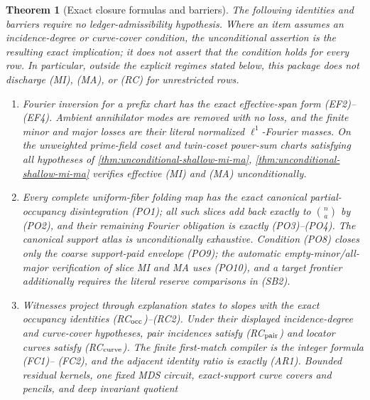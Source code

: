 \documentclass[12pt,a4paper]{amsart}
\numberwithin{equation}{section}
\newtheorem{theorem}{Theorem}[section]
\theoremstyle{remark}
\begin{document}
\begin{theorem}[Exact closure formulas and barriers]
\label{thm:intro-closure-barrier-package}
The following identities and barriers require no ledger-admissibility
hypothesis.  Where an item assumes an incidence-degree or curve-cover
condition, the unconditional assertion is the resulting exact implication;
it does not assert that the condition holds for every row.  In particular,
outside the explicit regimes stated below, this package does not discharge
\textup{(MI)}, \textup{(MA)}, or \textup{(RC)} for unrestricted rows.
\begin{enumerate}[label=\textup{(\roman*)},leftmargin=*]
\item Fourier inversion for a prefix chart has the exact effective-span
      form \textup{(EF2)}--\textup{(EF4)}.  Ambient annihilator modes are
      removed with no loss, and the finite minor and major losses are their
      literal normalized \(\ell^1\)-Fourier masses.  On the unweighted
      prime-field coset and twin-coset power-sum charts satisfying all
      hypotheses of \cref{thm:unconditional-shallow-mi-ma},
      \cref{thm:unconditional-shallow-mi-ma} verifies effective
      \textup{(MI)} and \textup{(MA)} unconditionally.
\item Every complete uniform-fiber folding map has the exact canonical
      partial-occupancy disintegration \textup{(PO1)}; all such slices add
      back exactly to \(\binom na\) by \textup{(PO2)}, and their remaining
      Fourier obligation is exactly \textup{(PO3)}--\textup{(PO4)}.  The
      canonical support atlas is unconditionally exhaustive.  Condition
      \textup{(PO8)} closes only the coarse support-paid envelope
      \textup{(PO9)}; the automatic empty-minor/all-major verification of
      slice MI and MA uses \textup{(PO10)}, and a target frontier
      additionally requires the literal reserve comparisons in
      \textup{(SB2)}.
\item Witnesses project through explanation states to slopes with the
      exact occupancy identities \textup{(RC$_{\rm occ}$)}--\textup{(RC2)}.
      Under their displayed incidence-degree and curve-cover hypotheses,
      pair incidences satisfy \textup{(RC$_{\rm pair}$)} and locator
      curves satisfy \textup{(RC$_{\rm curve}$)}.  The finite
      first-match compiler is the integer formula \textup{(FC1)}--
      \textup{(FC2)}, and the adjacent identity ratio is exactly
      \textup{(AR1)}.  Bounded residual kernels, one fixed MDS circuit,
      exact-support curve covers and pencils, and deep invariant quotient

\end{enumerate}
\end{theorem}
\end{document}
